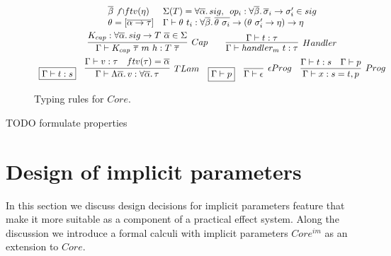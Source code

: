 \documentclass[acmsmall]{acmart}
\newcommand{\mathframebox}[1]{\framebox{$\displaystyle #1$}}
\newcommand{\ap}{~}
\begin{document}
\begin{figure}
\begin{gather*}
{            \begin{array}{ll}
                \overline{\beta}\not\cap ftv(\eta) & %
                \Sigma(T) = \forall\overline{\alpha}\ldotp sig, \hspace{0.5em} op_i : \forall\overline{\beta}\ldotp \overline{\sigma}_i\to\sigma'_i \in sig
                \\
                \theta = [\overline{\alpha\to\tau}] &
                \Gamma\vdash\theta\ap t_i : \forall \overline{\beta}\ldotp \overline{\theta\ap\sigma_i}\to(\theta\ap\sigma_i'\to\eta)\to\eta
            \end{array}
        }\\
        \infer[Cap]{
            \Gamma\vdash K_{cap}\ap\overline{\tau}\ap m\ap h : T\ap\overline{\tau}
        }{
            K_{cap} : \forall\overline{\alpha}\ldotp sig\to T\ap\overline{\alpha} \in \Sigma
        } %
        \hspace{2em}
        \infer[Handler]{
            \Gamma\vdash handler_m ~t : \tau
        }{
            \Gamma\vdash t : \tau
        }\\
        \begin{array}{ccccc}
            \mathframebox{\Gamma\vdash t : s} &
            \infer[TLam]{
                \Gamma\vdash\Lambda\overline{\alpha}\ldotp v : \forall\overline{\alpha}\ldotp\tau
            }{
                \Gamma\vdash v : \tau & ftv(\tau) = \overline{\alpha}
            } &
            \mathframebox{\Gamma\vdash p} &
            \infer[\epsilon Prog]{\Gamma\vdash\epsilon}{} &
            \infer[Prog]{\Gamma\vdash x : s = t, p}{\Gamma\vdash t : s & \Gamma\vdash p}
        \end{array}
    \end{gather*}
    \caption{Typing rules for $Core$.}
    \label{fig:core-typing}
\end{figure}

TODO formulate properties %

\section{Design of implicit parameters} \label{sec:implicits}

In this section we discuss design decisions for implicit parameters feature that make it more suitable as a component of a practical effect system.
Along the discussion we introduce a formal calculi with implicit parameters $Core^{im}$ as an extension to $Core$.
\end{document}
